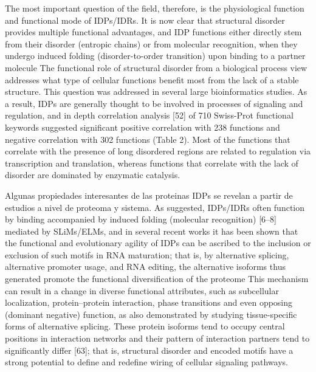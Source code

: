 The most important question of the field, therefore, is the physiological function and functional mode of IDPs/IDRs.
It is now clear that structural disorder provides multiple functional advantages\cite{gunasekaran2003extended,dyson2005intrinsically},
and IDP functions either directly stem from their disorder (entropic chains) or from molecular recognition, when they undergo induced folding (disorder-to-order transition) upon binding to a partner molecule
The functional role of structural disorder from a biological process view addresses what type of cellular functions benefit most from the lack of a stable structure. This
question was addressed in several large bioinformatics studies. As a result, IDPs are generally thought to be involved in processes of signaling and regulation, and in depth correlation analysis [52] of 710 Swiss-Prot functional keywords suggested significant positive correlation with 238 functions and negative correlation with 302 functions (Table 2). Most of the functions that correlate with the
presence of long disordered regions are related to regulation via transcription and translation, whereas functions
that correlate with the lack of disorder are dominated by
enzymatic catalysis.

Algunas propiedades interesantes de las proteinas IDPs se revelan a partir de estudios a nivel de proteoma y sistema.
As suggested, IDPs/IDRs often function by binding accompanied by induced folding (molecular recognition) [6–8] mediated by SLiMs/ELMs, and in several recent
works it has been shown that the functional and evolutionary agility of IDPs can be ascribed to the inclusion or exclusion of such motifs in RNA maturation; that is, by alternative splicing, alternative promoter usage, and RNA
editing, the alternative isoforms thus generated promote the functional diversification of the proteome
This
mechanism can result in a change in diverse functional attributes, such as subcellular localization, protein–protein interaction, phase transitions and even opposing (dominant negative) function, as also demonstrated by
studying tissue-specific forms of alternative splicing. These protein isoforms tend to occupy central positions in interaction networks and their pattern of interaction partners tend to significantly differ [63]; that is, structural disorder
and encoded motifs have a strong potential to define and redefine wiring of cellular signaling pathways.













